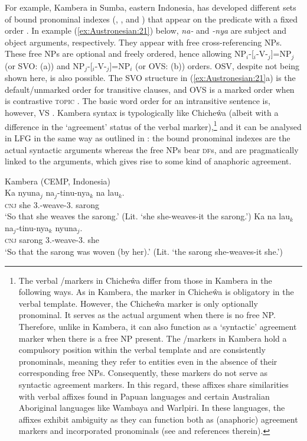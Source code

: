 \documentclass[output=paper,chinesefont]{../langscibook}
\begin{document}
\largerpage[-3]
For example, Kambera in Sumba, eastern Indonesia, has developed different sets of bound pronominal indexes (\NOM, \ACC, \GEN and \DAT) that appear on the predicate with a fixed order \citep[79]{Klamer1998}. In example (\ref{ex:Austronesian:21}) below, \emph{na-} and \emph{-nya} are subject and object arguments, respectively. They appear with free cross-referencing NPs. These free NPs are optional and freely ordered, hence allowing NP$_i$-[{\SUBJ}$_i$-V-{\OBJ}$_j$]=NP$_j$ (or SVO: (a)) and NP$_j$-[{\SUBJ}$_i$-V-{\OBJ}$_j$]=NP$_i$ (or OVS: (b)) orders. OSV, despite not being shown here, is also possible. The SVO structure in (\ref{ex:Austronesian:21}a) is the default/unmarked order for transitive clauses, and OVS is a marked order when \OBJ is contrastive \textsc{topic} \citep[22]{Klamer1996}. The basic word order for an intransitive sentence is, however, VS \citep[85]{Klamer1998}. Kambera syntax is typologically like Chiche\^wa (albeit with a difference in the `agreement' status of the verbal \SUBJ marker),\footnote{The verbal \SUBJ/\OBJ markers in Chiche\^wa differ from those in Kambera in the following ways. As in Kambera, the \SUBJ marker in Chiche\^wa is obligatory in the verbal template. However, the Chiche\^wa \SUBJ marker is only optionally pronominal. It serves as the actual argument when there is no free \SUBJ NP. Therefore, unlike in Kambera, it can also function as a `syntactic' agreement marker when there is a free \SUBJ NP present. The \SUBJ/\OBJ markers in Kambera hold a compulsory position within the verbal template and are consistently pronominals, meaning they refer to entities even in the absence of their corresponding free NPs. Consequently, these markers do not serve as syntactic agreement markers. In this regard, these affixes share similarities with verbal affixes found in Papuan languages \citep{Arka:PapuanNumber} and certain Australian Aboriginal languages like Wambaya and Warlpiri. In these languages, the affixes exhibit ambiguity as they can function both as (anaphoric) agreement markers and incorporated pronominals (see \citealt{AustBres96} and references therein).} and it can be analysed in LFG in the same way as outlined in \citet{BM87}: the bound pronominal indexes are the actual syntactic arguments whereas the free NPs bear \textsc{df}s, and are pragmatically linked to the arguments, which gives rise to some kind of anaphoric agreement.

\ea\label{ex:Austronesian:21} Kambera (CEMP, Indonesia) \citep[13]{Klamer1996}\\
\ea\gll
Ka nyuna$_j$ na$_j$-tinu-nya$_k$ na lau$_k$. \\
 \textsc{cnj} she 3{\SG.\NOM}-weave-3{\SG.\DAT} {\ART} sarong\\
\glt`So that she weaves the sarong.' (Lit. `she she-weaves-it the sarong.')
\ex\gll
Ka na lau$_k$ na$_j$-tinu-nya$_k$ nyuna$_j$.\\
\textsc{cnj} {\ART} sarong 3{\SG.\NOM}-weave-3{\SG.\DAT} she\\
\glt`So that the sarong was woven (by her).' (Lit. `the sarong she-weaves-it she.')
\z\z
\end{document}
